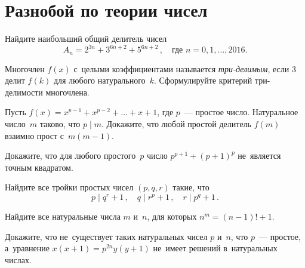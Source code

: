 
\section*{Разнобой по теории чисел}


\begingroup
    \def\divides{\mathrel{\vert}}%

\begin{problems}

\item
Найдите наибольший общий делитель чисел
\[
    A_{n} = 2^{3n} + 3^{6n+2} + 5^{6n+2}
\, , \quad
    \text{где $n = 0, 1, \ldots, 2016$}
.\]

\item
Многочлен $f(x)$ с~целыми коэффициентами называется \emph{три-делимым}, если
$3$ делит $f(k)$ для любого натурального~$k$.
Сформулируйте критерий три-делимости многочлена.

\item
Пусть $f(x) = x^{p-1} + x^{p-2} + \ldots + x + 1$, где $p$~--- простое число.
Натуральное число~$m$ таково, что $p \divides m$.
Докажите, что любой простой делитель $f(m)$ взаимно прост с~$m (m - 1)$. 

\item
Докажите, что для любого простого~$p$ число $p^{p+1} + (p + 1)^p$ не~является
точным квадратом.

\item
Найдите все тройки простых чисел $(p, q, r)$ такие, что
\[
    p \divides q^{r} + 1
\, , \quad
    q \divides r^{p} + 1
\, , \quad
    r \divides p^{q} + 1
\, . \]

\item
Найдите все натуральные числа $m$ и~$n$, для которых $n^{m} = (n - 1)! + 1$.

\item
Докажите, что не~существует таких натуральных чисел $p$ и~$n$, что $p$~---
простое, а~уравнение $x (x + 1) = p^{2n} y (y + 1)$ не~имеет решений
в~натуральных числах.

\end{problems}

\endgroup %

